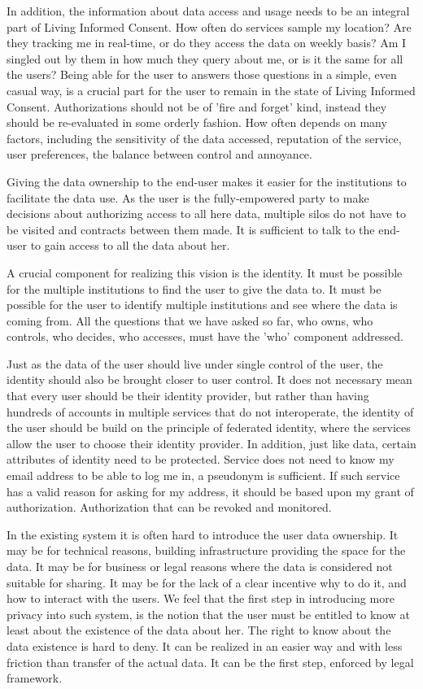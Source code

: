 In addition, the information about data access and usage needs to be an integral part of Living Informed Consent.
How often do services sample my location?
Are they tracking me in real-time, or do they access the data on weekly basis? 
Am I singled out by them in how much they query about me, or is it the same for all the users?
Being able for the user to answers those questions in a simple, even casual way, is a crucial part for the user to remain in the state of Living Informed Consent.
Authorizations should not be of 'fire and forget' kind, instead they should be re-evaluated in some orderly fashion.
How often depends on many factors, including the sensitivity of the data accessed, reputation of the service, user preferences, the balance between control and annoyance. 

Giving the data ownership to the end-user makes it easier for the institutions to facilitate the data use.
As the user is the fully-empowered party to make decisions about authorizing access to all here data, multiple silos do not have to be visited and contracts between them made.
It is sufficient to talk to the end-user to gain access to all the data about her. 

A crucial component for realizing this vision is the identity.
It must be possible for the multiple institutions to find the user to give the data to. It must be possible for the user to identify multiple institutions and see where the data is coming from. 
All the questions that we have asked so far, who owns, who controls, who decides, who accesses, must have the 'who' component addressed.

Just as the data of the user should live under single control of the user, the identity should also be brought closer to user control.
It does not necessary mean that every user should be their identity provider, but rather than having hundreds of accounts in multiple services that do not interoperate, the identity of the user should be build on the principle of federated identity, where the services allow the user to choose their identity provider.
In addition, just like data, certain attributes of identity need to be protected.
Service does not need to know my email address to be able to log me in, a pseudonym is sufficient.
If such service has a valid reason for asking for my address, it should be based upon my grant of authorization.
Authorization that can be revoked and monitored.

In the existing system it is often hard to introduce the user data ownership. It may be for technical reasons, building infrastructure providing the space for the data.
It may be for business or legal reasons where the data is considered not suitable for sharing.
It may be for the lack of a clear incentive why to do it, and how to interact with the users.
We feel that the first step in introducing more privacy into such system, is the notion that the user must be entitled to know at least about the existence of the data about her.
The right to know about the data existence is hard to deny. It can be realized in an easier way and with less friction than transfer of the actual data. It can be the first step, enforced by legal framework.
